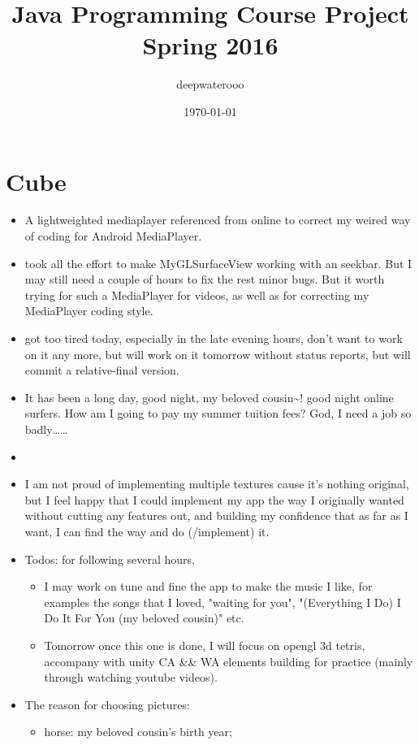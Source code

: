 \documentclass[9pt,b5paper]{article}
\author{deepwaterooo}
\date{\today}
\title{Java Programming Course Project Spring 2016}
\begin{document}
\maketitle
\tableofcontents


\section{Cube}
\label{sec-1}
\begin{itemize}
\item A lightweighted mediaplayer referenced from online to correct my weired way of coding for Android MediaPlayer.
\item took all the effort to make MyGLSurfaceView working with an seekbar. But I may still need a couple of hours to fix the rest minor bugs. But it worth trying for such a MediaPlayer for videos, as well as for correcting my MediaPlayer coding style.
\item got too tired today, especially in the late evening hours, don't want to work on it any more, but will work on it tomorrow without status reports, but will commit a relative-final version.
\item It has been a long day, good night, my beloved cousin\textasciitilde{}! good night online surfers. How am I going to pay my summer tuition fees?  God, I need a job so badly\ldots{}\ldots{}
\item 
\item I am not proud of implementing multiple textures cause it's nothing original, but I feel happy that I could implement my app the way I originally wanted without cutting any features out, and building my confidence that as far as I want, I can find the way and do (/implement) it.
\item Todos: for following several hours, 
\begin{itemize}
\item I may work on tune and fine the app to make the music I like, for examples the songs that I loved, "waiting for you", "(Everything I Do) I Do It For You (my beloved cousin)" etc.
\item Tomorrow once this one is done, I will focus on opengl 3d tetris, accompany with unity CA \&\& WA elements building for practice (mainly through watching youtube videos).
\end{itemize}
\item The reason for choosing pictures: 
\begin{itemize}
\item horse: my beloved cousin's birth year;

\end{itemize}
\end{itemize}
\end{document}
